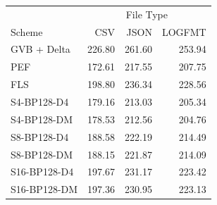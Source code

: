 \begin{tabular}{lrrr}
\toprule
 & \multicolumn{3}{c}{File Type} \\
Scheme & CSV & JSON & LOGFMT \\
\midrule
GVB + Delta & 226.80 & 261.60 & 253.94 \\
PEF & 172.61 & 217.55 & 207.75 \\
FLS & 198.80 & 236.34 & 228.56 \\
S4-BP128-D4 & 179.16 & 213.03 & 205.34 \\
S4-BP128-DM & 178.53 & 212.56 & 204.76 \\
S8-BP128-D4 & 188.58 & 222.19 & 214.49 \\
S8-BP128-DM & 188.15 & 221.87 & 214.09 \\
S16-BP128-D4 & 197.67 & 231.17 & 223.42 \\
S16-BP128-DM & 197.36 & 230.95 & 223.13 \\
\bottomrule
\end{tabular}
